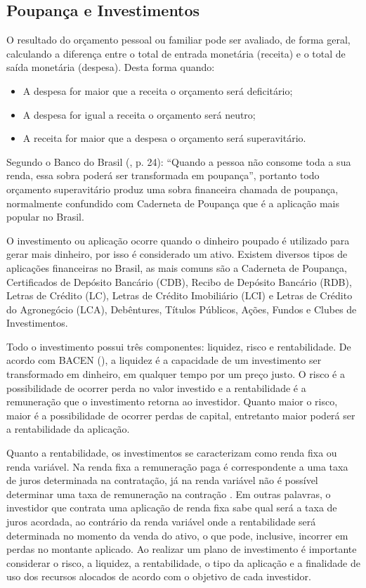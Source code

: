\subsection{Poupança e Investimentos}
O resultado do orçamento pessoal ou familiar pode ser avaliado, de forma geral, calculando a diferença entre o total de entrada monetária (receita) e o total de saída monetária (despesa). Desta forma quando:

\begin{itemize}
    \item A despesa for maior que a receita o orçamento será deficitário;
    \item A despesa for igual a receita o orçamento será neutro;
    \item A receita for maior que a despesa o orçamento será superavitário.
\end{itemize}

Segundo o Banco do Brasil (\citeyear{bb2012}, p. 24): “Quando a pessoa não consome toda a sua renda, essa sobra poderá ser transformada em poupança”, portanto todo orçamento superavitário produz uma sobra financeira chamada de poupança, normalmente confundido com Caderneta de Poupança que é a aplicação mais popular no Brasil.

O investimento ou aplicação ocorre quando o dinheiro poupado é utilizado para gerar mais dinheiro, por isso é considerado um ativo. Existem diversos tipos de aplicações financeiras no Brasil, as mais comuns são a Caderneta de Poupança, Certificados de Depósito Bancário (CDB), Recibo de Depósito Bancário (RDB), Letras de Crédito (LC), Letras de Crédito Imobiliário (LCI) e Letras de Crédito do Agronegócio (LCA), Debêntures, Títulos Públicos, Ações, Fundos e Clubes de Investimentos.

Todo o investimento possui três componentes: liquidez, risco e rentabilidade. De acordo com BACEN (\citeyear{bacen2013}), a liquidez é a capacidade de um investimento ser transformado em dinheiro, em qualquer tempo por um preço justo. O risco é a possibilidade de ocorrer perda no valor investido e a rentabilidade é a remuneração que o investimento retorna ao investidor. Quanto maior o risco, maior é a possibilidade de ocorrer perdas de capital, entretanto maior poderá ser a rentabilidade da aplicação.

Quanto a rentabilidade, os investimentos se caracterizam como renda fixa ou renda variável. Na renda fixa a remuneração paga é correspondente a uma taxa de juros determinada na contratação, já na renda variável não é possível determinar uma taxa de remuneração na contração \cite{bacen2013}. Em outras palavras, o investidor que contrata uma aplicação de renda fixa sabe qual será a taxa de juros acordada, ao contrário da renda variável onde a rentabilidade será determinada no momento da venda do ativo, o que pode, inclusive, incorrer em perdas no montante aplicado. Ao realizar um plano de investimento é importante considerar o risco, a liquidez, a rentabilidade, o tipo da aplicação e a finalidade de uso dos recursos alocados de acordo com o objetivo de cada investidor.

